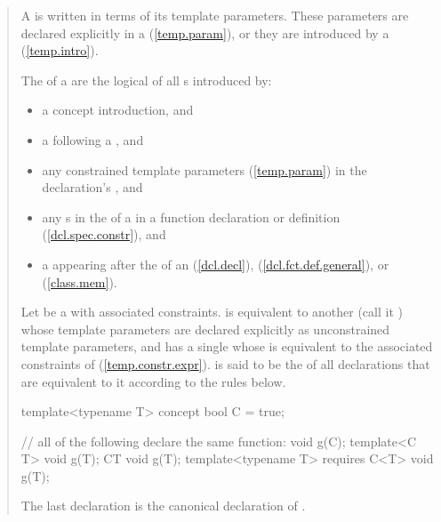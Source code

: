 \begin{quote}
\setcounter{Paras}{6}
\pnum
A  is written in terms of its template 
parameters. These parameters are declared explicitly in a 
 (\ref{temp.param}), or they are
introduced by a  (\ref{temp.intro}).


\pnum
The  of a 
 are the 
logical \tcode{\&\&} of all 
s introduced by:
% 
\begin{itemize}
\item a concept introduction, and

\item a  following a
, and

\item any constrained template parameters (\ref{temp.param})
in the declaration's ,
and 

\item any s
in the  of
a  in a function
declaration or definition (\ref{dcl.spec.constr}), and

\item a  appearing after
the  of an
(\ref{dcl.decl}),
(\ref{dcl.fct.def.general}), or
(\ref{class.mem}).
\end{itemize}
% 
Let  be a 
with associated constraints.  is equivalent to another
 (call it ) 
whose template parameters are declared explicitly as unconstrained template 
parameters, and  has a single
 whose 
 is equivalent to 
the associated constraints of  
(\ref{temp.constr.expr}).  is said
to be the  of all declarations that are 
equivalent to it according to the rules below.
% 
\enterexample
\begin{codeblock}
template<typename T> concept bool C = true;

// all of the following declare the same function:
void g(C);
template<C T> void g(T);
C{T} void g(T);
template<typename T> requires C<T> void g(T);
\end{codeblock}
The last declaration is the canonical declaration of .
\exitexample



\end{quote}
